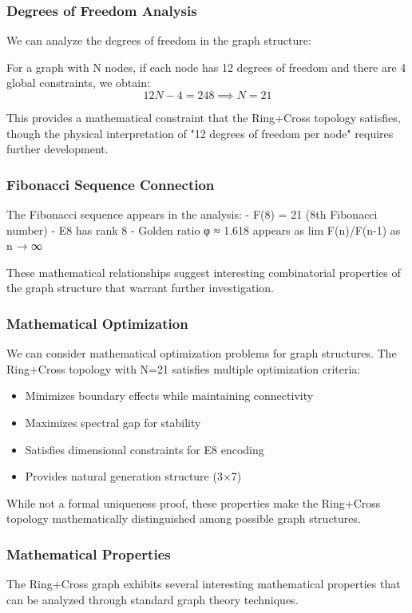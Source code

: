 \documentclass[12pt,a4paper]{article}
\begin{document}
\subsubsection{Degrees of Freedom Analysis}
We can analyze the degrees of freedom in the graph structure:

For a graph with N nodes, if each node has 12 degrees of freedom and there are 4 global constraints, we obtain:
\[12N - 4 = 248 \implies N = 21\]

This provides a mathematical constraint that the Ring+Cross topology satisfies, though the physical interpretation of "12 degrees of freedom per node" requires further development.

\subsubsection{Fibonacci Sequence Connection}
The Fibonacci sequence appears in the analysis:
- F(8) = 21 (8th Fibonacci number)
- E8 has rank 8
- Golden ratio φ ≈ 1.618 appears as lim F(n)/F(n-1) as n → ∞

These mathematical relationships suggest interesting combinatorial properties of the graph structure that warrant further investigation.

\subsubsection{Mathematical Optimization}
We can consider mathematical optimization problems for graph structures. The Ring+Cross topology with N=21 satisfies multiple optimization criteria:

\begin{itemize}
\item Minimizes boundary effects while maintaining connectivity
\item Maximizes spectral gap for stability
\item Satisfies dimensional constraints for E8 encoding
\item Provides natural generation structure (3×7)
\end{itemize}

While not a formal uniqueness proof, these properties make the Ring+Cross topology mathematically distinguished among possible graph structures.

\subsubsection{Mathematical Properties}
The Ring+Cross graph exhibits several interesting mathematical properties that can be analyzed through standard graph theory techniques.
\end{document}
